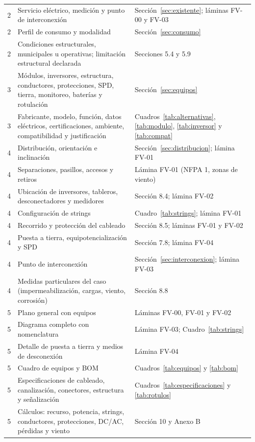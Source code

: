 \documentclass[12pt]{article}
\begin{document}
{\begin{longtable}{L{1.1cm}L{7.2cm}L{6.6cm}}
2 & Servicio eléctrico, medición y punto de interconexión & Sección~\ref{sec:existente}; láminas FV-00 y FV-03\\
2 & Perfil de consumo y modalidad & Sección~\ref{sec:consumo}\\
2 & Condiciones estructurales, municipales u operativas; limitación estructural declarada & Secciones 5.4 y 5.9\\
3 & Módulos, inversores, estructura, conductores, protecciones, SPD, tierra, monitoreo, baterías y rotulación & Sección~\ref{sec:equipos}\\
3 & Fabricante, modelo, función, datos eléctricos, certificaciones, ambiente, compatibilidad y justificación & Cuadros~\ref{tab:alternativas}, \ref{tab:modulo}, \ref{tab:inversor} y \ref{tab:compat}\\
4 & Distribución, orientación e inclinación & Sección~\ref{sec:distribucion}; lámina FV-01\\
4 & Separaciones, pasillos, accesos y retiros & Lámina FV-01 (NFPA 1, zonas de viento)\\
4 & Ubicación de inversores, tableros, desconectadores y medidores & Sección 8.4; lámina FV-02\\
4 & Configuración de strings & Cuadro~\ref{tab:strings}; lámina FV-01\\
4 & Recorrido y protección del cableado & Sección 8.5; láminas FV-01 y FV-02\\
4 & Puesta a tierra, equipotencialización y SPD & Sección 7.8; lámina FV-04\\
4 & Punto de interconexión & Sección~\ref{sec:interconexion}; lámina FV-03\\
4 & Medidas particulares del caso (impermeabilización, cargas, viento, corrosión) & Sección 8.8\\
5 & Plano general con equipos & Láminas FV-00, FV-01 y FV-02\\
5 & Diagrama completo con nomenclatura & Lámina FV-03; Cuadro~\ref{tab:strings}\\
5 & Detalle de puesta a tierra y medios de desconexión & Lámina FV-04\\
5 & Cuadro de equipos y BOM & Cuadros~\ref{tab:equipos} y \ref{tab:bom}\\
5 & Especificaciones de cableado, canalización, conectores, estructura y señalización & Cuadros~\ref{tab:especificaciones} y \ref{tab:rotulos}\\
5 & Cálculos: recurso, potencia, strings, conductores, protecciones, DC/AC, pérdidas y viento & Sección 10 y Anexo B\\

\end{longtable}}
\end{document}
